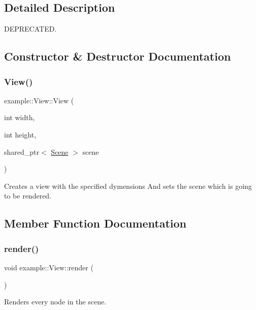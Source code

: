 \subsection{Detailed Description}
D\+E\+P\+R\+E\+C\+A\+T\+ED. 

\subsection{Constructor \& Destructor Documentation}
\mbox{\label{classoglsl_1_1_view_ae7f67b78cdd174449edc93960f29d9f4}} 
\subsubsection{\texorpdfstring{View()}{View()}}
{\footnotesize\ttfamily example\+::\+View\+::\+View (\begin{DoxyParamCaption}\item[{int}]{width,  }\item[{int}]{height,  }\item[{shared\+\_\+ptr$<$ \mbox{\hyperlink{classoglsl_1_1_scene}{Scene}} $>$}]{scene }\end{DoxyParamCaption})}



Creates a view with the specified dymensions And sets the scene which is going to be rendered. 



\subsection{Member Function Documentation}
\mbox{\label{classoglsl_1_1_view_a10ea89fc705a2ba2252f673499524bf2}} 
\subsubsection{\texorpdfstring{render()}{render()}}
{\footnotesize\ttfamily void example\+::\+View\+::render (\begin{DoxyParamCaption}{ }\end{DoxyParamCaption})}



Renders every node in the scene. 

